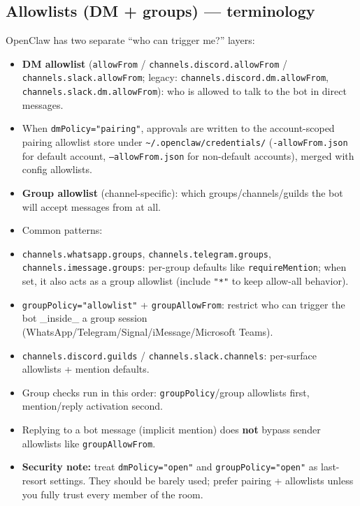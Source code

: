 \subsection{Allowlists (DM + groups) — terminology}


OpenClaw has two separate “who can trigger me?” layers:

\begin{itemize}
  \item \textbf{DM allowlist} (\texttt{allowFrom} / \texttt{channels.discord.allowFrom} / \texttt{channels.slack.allowFrom}; legacy: \texttt{channels.discord.dm.allowFrom}, \texttt{channels.slack.dm.allowFrom}): who is allowed to talk to the bot in direct messages.
  \item When \texttt{dmPolicy="pairing"}, approvals are written to the account-scoped pairing allowlist store under \texttt{\textasciitilde{}/.openclaw/credentials/} (\texttt{-allowFrom.json} for default account, \texttt{--allowFrom.json} for non-default accounts), merged with config allowlists.
  \item \textbf{Group allowlist} (channel-specific): which groups/channels/guilds the bot will accept messages from at all.
  \item Common patterns:
  \item \texttt{channels.whatsapp.groups}, \texttt{channels.telegram.groups}, \texttt{channels.imessage.groups}: per-group defaults like \texttt{requireMention}; when set, it also acts as a group allowlist (include \texttt{"*"} to keep allow-all behavior).
  \item \texttt{groupPolicy="allowlist"} + \texttt{groupAllowFrom}: restrict who can trigger the bot \_inside\_ a group session (WhatsApp/Telegram/Signal/iMessage/Microsoft Teams).
  \item \texttt{channels.discord.guilds} / \texttt{channels.slack.channels}: per-surface allowlists + mention defaults.
  \item Group checks run in this order: \texttt{groupPolicy}/group allowlists first, mention/reply activation second.
  \item Replying to a bot message (implicit mention) does \textbf{not} bypass sender allowlists like \texttt{groupAllowFrom}.
  \item \textbf{Security note:} treat \texttt{dmPolicy="open"} and \texttt{groupPolicy="open"} as last-resort settings. They should be barely used; prefer pairing + allowlists unless you fully trust every member of the room.
\end{itemize}


